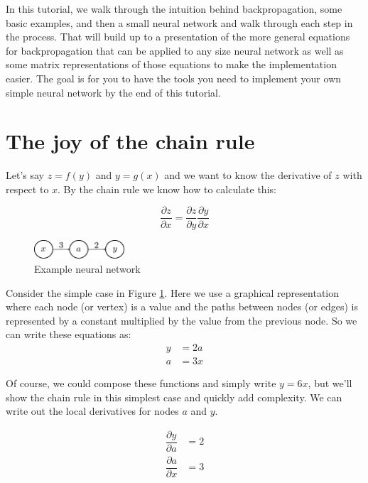 \documentclass{article}
\begin{document}
In this tutorial, we walk through the intuition behind backpropagation, some basic examples, and then a small neural network and walk through each step in the process. That will build up to a presentation of the more general equations for backpropagation that can be applied to any size neural network as well as some matrix representations of those equations to make the implementation easier. The goal is for you to have the tools you need to implement your own simple neural network by the end of this tutorial.

\section{The joy of the chain rule}

Let's say $z=f(y)$ and $y=g(x)$ and we want to know the derivative of $z$ with respect to $x$. By the chain rule we know how to calculate this:

\begin{equation}
    \dfrac{\partial z}{\partial x} = \dfrac{\partial z}{\partial y} \dfrac{\partial y}{\partial x}
\end{equation}

\begin{figure}[h]
\centering
\includegraphics[width=0.3\textwidth]{./neural_networks_gradients_ex1.eps}
\caption{Example neural network}
\label{fig:ex1}
\end{figure}

Consider the simple case in Figure \ref{fig:ex1}. Here we use a graphical representation where each node (or vertex) is a value and the paths between nodes (or edges) is represented by a constant multiplied by the value from the previous node. So we can write these equations as:
\begin{align}
    y &= 2a \\
    a &= 3x
\end{align}

Of course, we could compose these functions and simply write $y=6x$, but we'll show the chain rule in this simplest case and quickly add complexity. We can write out the local derivatives for nodes $a$ and $y$.

\begin{align}
    \dfrac{\partial y}{\partial a} &= 2 \\
    \dfrac{\partial a}{\partial x} &= 3
\end{align}
\end{document}
